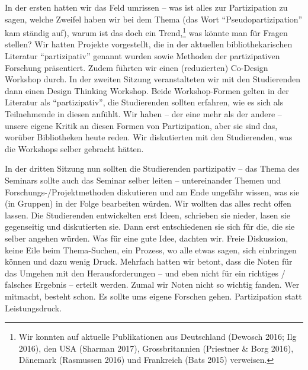 \documentclass[a4paper,
fontsize=11pt,
oneside,
numbers=noperiodatend,
parskip=half-,
bibliography=totoc,
final
]{scrartcl}
\begin{document}
In der ersten hatten wir das Feld umrissen -- was ist alles zur
Partizipation zu sagen, welche Zweifel haben wir bei dem Thema (das Wort
\enquote{Pseudopartizipation} kam ständig auf), warum ist das doch ein
Trend,\footnote{Wir konnten auf aktuelle Publikationen aus Deutschland
  (Dewosch 2016; Ilg 2016), den USA (Sharman 2017), Grossbritannien
  (Priestner \& Borg 2016), Dänemark (Rasmussen 2016) und Frankreich
  (Bats 2015) verweisen.} was könnte man für Fragen stellen? Wir hatten
Projekte vorgestellt, die in der aktuellen bibliothekarischen Literatur
\enquote{partizipativ} genannt wurden sowie Methoden der partizipativen
Forschung präsentiert. Zudem führten wir einen (reduzierten) Co-Design
Workshop durch. In der zweiten Sitzung veranstalteten wir mit den
Studierenden dann einen Design Thinking Workshop. Beide Workshop-Formen
gelten in der Literatur als \enquote{partizipativ}, die Studierenden
sollten erfahren, wie es sich als Teilnehmende in diesen anfühlt. Wir
haben -- der eine mehr als der andere -- unsere eigene Kritik an diesen
Formen von Partizipation, aber sie sind das, worüber Bibliotheken heute
reden. Wir diskutierten mit den Studierenden, was die Workshops selber
gebracht hätten.

In der dritten Sitzung nun sollten die Studierenden partizipativ -- das
Thema des Seminars sollte auch das Seminar selber leiten --
untereinander Themen und Forschungs-/Projektmethoden diskutieren und am
Ende ungefähr wissen, was sie (in Gruppen) in der Folge bearbeiten
würden. Wir wollten das alles recht offen lassen. Die Studierenden
entwickelten erst Ideen, schrieben sie nieder, lasen sie gegenseitig und
diskutierten sie. Dann erst entschiedenen sie sich für die, die sie
selber angehen würden. Was für eine gute Idee, dachten wir. Freie
Diskussion, keine Eile beim Thema-Suchen, ein Prozess, wo alle etwas
sagen, sich einbringen können und dazu wenig Druck. Mehrfach hatten wir
betont, dass die Noten für das Umgehen mit den Herausforderungen -- und
eben nicht für ein richtiges / falsches Ergebnis -- erteilt werden.
Zumal wir Noten nicht so wichtig fanden. Wer mitmacht, besteht schon. Es
sollte ums eigene Forschen gehen. Partizipation statt Leistungsdruck.
\end{document}
